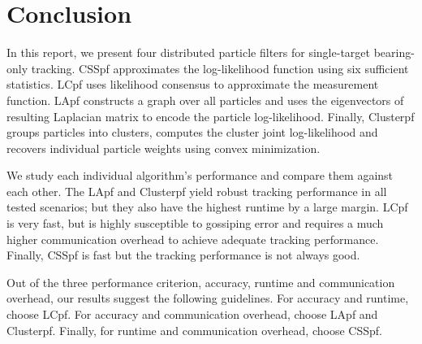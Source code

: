 \documentclass[10pt,letterpaper,final]{article}
\begin{document}
\section{Conclusion}
\label{sec:conclusion}
In this report, we present four distributed particle filters for single-target bearing-only tracking. CSSpf approximates the log-likelihood function using six sufficient statistics. LCpf uses likelihood consensus to approximate the measurement function. LApf constructs a graph over all particles and uses the eigenvectors of resulting Laplacian matrix to encode the particle log-likelihood. Finally, Clusterpf groups particles into clusters, computes the cluster joint log-likelihood and recovers individual particle weights using convex minimization. 

We study each individual algorithm's performance and compare them against each other. The LApf and Clusterpf yield robust tracking performance in all tested scenarios; but they also have the highest runtime by a large margin. LCpf is very fast, but is highly susceptible to gossiping error and requires a much higher communication overhead to achieve adequate tracking performance. Finally, CSSpf is fast but the tracking performance is not always good. 

Out of the three performance criterion, accuracy, runtime and communication overhead, our results suggest the following guidelines. For accuracy and runtime, choose LCpf. For accuracy and communication overhead, choose LApf and Clusterpf. Finally, for runtime and communication overhead, choose CSSpf. 



\end{document}
